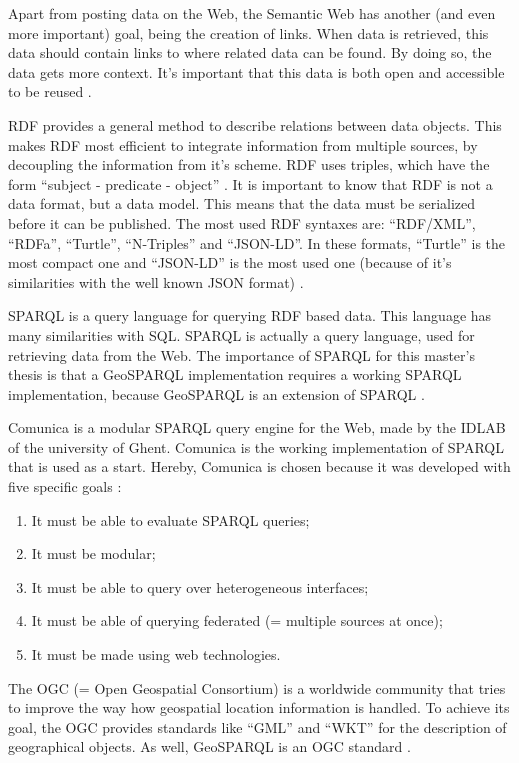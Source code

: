 \documentclass[twocolumn]{phdsymp} %
\begin{document}
Apart from posting data on the Web, the Semantic Web has another (and even more important) goal, being the creation of links. When data is retrieved, this data should contain links to where related data can be found. By doing so, the data gets more context. It's important that this data is both open and accessible to be reused \cite{berners2001semantic}.

RDF provides a general method to describe relations between data objects. This makes RDF most efficient to integrate information from multiple sources, by decoupling the information from it's scheme. RDF uses triples, which have the form ``subject - predicate - object'' \cite{lassila1998resource}. It is important to know that RDF is not a data format, but a data model. This means that the data must be serialized before it can be published. The most used RDF syntaxes are: ``RDF/XML'', ``RDFa'', ``Turtle'', ``N-Triples'' and ``JSON-LD''. In these formats, ``Turtle'' is the most compact one and ``JSON-LD'' is the most used one (because of it's similarities with the well known JSON format) \cite{heath2011linked}.

SPARQL is a query language for querying RDF based data. This language has many similarities with SQL. SPARQL is actually a query language, used for retrieving data from the Web. The importance of SPARQL for this master's thesis is that a GeoSPARQL implementation requires a working SPARQL implementation, because GeoSPARQL is an extension of SPARQL \cite{sparql2013querylanguage}.

Comunica is a modular SPARQL query engine for the Web, made by the IDLAB of the university of Ghent. Comunica is the working implementation of SPARQL that is used as a start. Hereby, Comunica is chosen because it was developed with five specific goals \cite{taelman2018comunica}:
\begin{enumerate}
    \item It must be able to evaluate SPARQL queries; 
    \item It must be modular;
    \item It must be able to query over heterogeneous interfaces;
    \item It must be able of querying federated (= multiple sources at once);
    \item It must be made using web technologies.
\end{enumerate}

The OGC (= Open Geospatial Consortium) is a worldwide community that tries to improve the way how geospatial location information is handled. To achieve its goal, the OGC provides standards like ``GML'' and ``WKT'' for the description of geographical objects. As well, GeoSPARQL is an OGC standard \cite{ogcdocs}.
\end{document}
